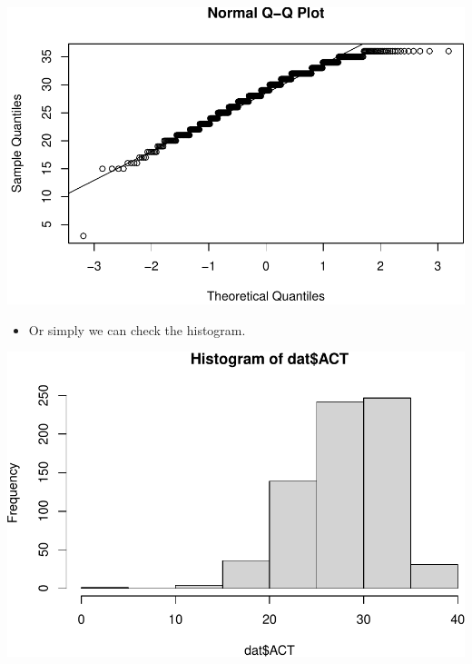 \documentclass[
]{book}
\newenvironment{Shaded}{\begin{snugshade}}{\end{snugshade}}
\newcommand{\CommentTok}[1]{\textcolor[rgb]{0.56,0.35,0.01}{\textit{#1}}}
\newcommand{\FunctionTok}[1]{\textcolor[rgb]{0.13,0.29,0.53}{\textbf{#1}}}
\newcommand{\NormalTok}[1]{#1}
\newcommand{\SpecialCharTok}[1]{\textcolor[rgb]{0.81,0.36,0.00}{\textbf{#1}}}
\providecommand{\tightlist}{%
  \setlength{\itemsep}{0pt}\setlength{\parskip}{0pt}}
\begin{document}
\begin{Shaded}
\end{Shaded}

\includegraphics{PSY202A-Modeling-I.Heo_files/figure-latex/unnamed-chunk-90-1.pdf}

\begin{itemize}
\tightlist
\item
  Or simply we can check the histogram.
\end{itemize}

\begin{Shaded}
\end{Shaded}

\includegraphics{PSY202A-Modeling-I.Heo_files/figure-latex/unnamed-chunk-91-1.pdf}
\end{document}
